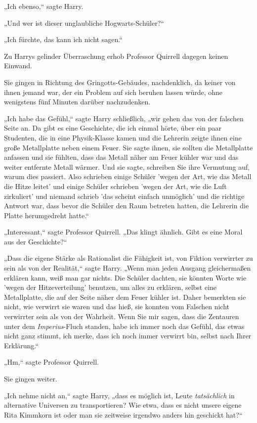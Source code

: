 {„Ich ebenso,“ sagte Harry.

„Und wer ist dieser unglaubliche Hogwarts-Schüler?“

„Ich fürchte, das kann ich nicht sagen.“

Zu Harrys gelinder Überraschung erhob Professor Quirrell dagegen keinen Einwand.

Sie gingen in Richtung des Gringotts-Gebäudes, nachdenklich, da keiner von ihnen jemand war, der ein Problem auf sich beruhen lassen würde, ohne wenigstens fünf Minuten darüber nachzudenken.

„Ich habe das Gefühl,“ sagte Harry schließlich, „wir gehen das von der falschen Seite an. Da gibt es eine Geschichte, die ich einmal hörte, über ein paar Studenten, die in eine Physik-Klasse kamen und die Lehrerin zeigte ihnen eine große Metallplatte neben einem Feuer. Sie sagte ihnen, sie sollten die Metallplatte anfassen und sie fühlten, dass das Metall näher am Feuer kühler war und das weiter entfernte Metall wärmer. Und sie sagte, schreiben Sie ihre Vermutung auf, warum dies passiert. Also schrieben einige Schüler 'wegen der Art, wie das Metall die Hitze leitet' und einige Schüler schrieben 'wegen der Art, wie die Luft zirkuliert' und niemand schrieb 'das scheint einfach unmöglich' und die richtige Antwort war, dass bevor die Schüler den Raum betreten hatten, die Lehrerin die Platte herumgedreht hatte.“

„Interessant,“ sagte Professor Quirrell. „Das klingt ähnlich. Gibt es eine Moral aus der Geschichte?“

„Dass die eigene Stärke als Rationalist die Fähigkeit ist, von Fiktion verwirrter zu sein als von der Realität,“ sagte Harry. „Wenn man jeden Ausgang gleichermaßen erklären kann, weiß man gar nichts. Die Schüler dachten, sie könnten Worte wie 'wegen der Hitzeverteilung' benutzen, um alles zu erklären, selbst eine Metallplatte, die auf der Seite näher dem Feuer kühler ist. Daher bemerkten sie nicht, wie verwirrt sie waren und das hieß, sie konnten vom Falschen nicht verwirrter sein als von der Wahrheit. Wenn Sie mir sagen, dass die Zentauren unter dem \emph{Imperius}-Fluch standen, habe ich immer noch das Gefühl, das etwas nicht ganz stimmt, ich merke, dass ich noch immer verwirrt bin, selbst nach Ihrer Erklärung.“

„Hm,“ sagte Professor Quirrell.

Sie gingen weiter.

„Ich nehme nicht an,“ sagte Harry, „dass es möglich ist, Leute \emph{tatsächlich} in alternative Universen zu transportieren? Wie etwa, dass es nicht unsere eigene Rita Kimmkorn ist oder man sie zeitweise irgendwo anders hin geschickt hat?“

}
